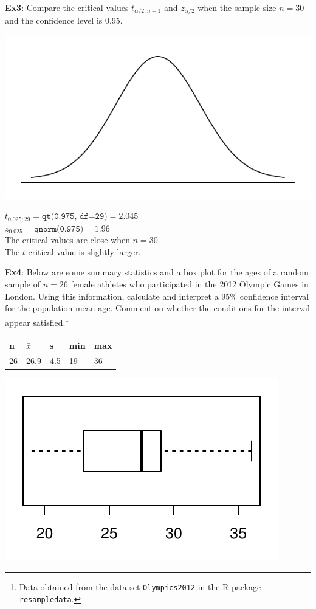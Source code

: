 \documentclass[fleqn, 12pt]{article}\usepackage[]{graphicx}\usepackage[]{color}
\begin{document}
\textbf{Ex3}:  Compare the critical values $t_{\alpha/2; n-1}$ and $z_{\alpha/2}$ when the sample size $n=30$ and the confidence level is 0.95.\\
\begin{multicols}{2}
\includegraphics[scale=0.6]{norm_draw.pdf}

\columnbreak

{\color{blue}
$t_{0.025; 29} = \texttt{qt(0.975, df=29)} = 2.045$\\
$z_{0.025} = \texttt{qnorm(0.975)} = 1.96$\\

The critical values are close when $n=30$.\\  
The $t$-critical value is slightly larger.\\
}
\end{multicols}

\bigskip

\textbf{Ex4}:  Below are some summary statistics and a box plot for the ages of a random sample of $n=26$ female athletes who participated in the 2012 Olympic Games in London.  Using this information, calculate and interpret a 95\% confidence interval for the population mean age.  Comment on whether the conditions for the interval appear satisfied.\footnote{Data obtained from the data set \texttt{Olympics2012} in the R package \texttt{resampledata}.} 

\begin{table}[ht]
\begin{tabular}{lllll}
\hline
n & $\bar{x}$ & s & min & max\\
\hline
26 & 26.9 & 4.5 & 19 & 36
\end{tabular}
\end{table}

\includegraphics[scale=0.7]{age_boxplot.pdf}
\end{document}
